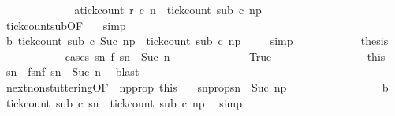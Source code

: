 \begin{isabellebody}
\ \isanewline
\ \ \ \ \ \ \ \ \ \ \isamarkupfalse%
\ a{\isacharcolon}{\isacartoucheopen}tick{\isacharunderscore}count\ r\ c\ n\ {\isacharequal}\ tick{\isacharunderscore}count\ sub\ c\ n\isactrlsub p{\isacartoucheclose}\isanewline
\ \ \ \ \ \ \ \ \ \ \ \ \isamarkupfalse%
\ tick{\isacharunderscore}count{\isacharunderscore}sub{\isacharbrackleft}OF\ {\isacharasterisk}{\isacharbrackright}\ \isamarkupfalse%
\ simp\isanewline
\ \ \ \ \ \ \ \ \ \ \isamarkupfalse%
\ b{\isacharcolon}\ {\isacartoucheopen}tick{\isacharunderscore}count\ sub\ c\ {\isacharparenleft}Suc\ n\isactrlsub p{\isacharparenright}\ {\isasymle}\ tick{\isacharunderscore}count\ sub\ c\ n\isactrlsub p{\isacartoucheclose}\ \isamarkupfalse%
\ {}\ \isamarkupfalse%
\ simp\isanewline
\ \ \ \ \ \ \ \ \ \ \isamarkupfalse%
\ {\isacharquery}thesis\isanewline
\ \ \ \ \ \ \ \ \ \ \isamarkupfalse%
\ {\isacharparenleft}cases\ {\isacartoucheopen}{\isasymexists}sn\ f\ sn\ {\isacharequal}\ Suc\ n{\isacartoucheclose}{\isacharparenright}\isanewline
\ \ \ \ \ \ \ \ \ \ \ \ \isamarkupfalse%
\ True\ %
\isanewline
\ \ \ \ \ \ \ \ \ \ \ \ \ \ \isamarkupfalse%
\ this\ \isamarkupfalse%
\ sn\ \ fsn{\isacharcolon}{\isacartoucheopen}f\ sn\ {\isacharequal}\ Suc\ n{\isacartoucheclose}\ \isamarkupfalse%
\ blast\isanewline
\ \ \ \ \ \ \ \ \ \ \ \ \ \ \isamarkupfalse%
\ next{\isacharunderscore}non{\isacharunderscore}stuttering{\isacharbrackleft}OF\ {\isacharasterisk}\ np{\isacharunderscore}prop\ this{\isacharbrackright}\ \ \isamarkupfalse%
\ sn{\isacharunderscore}prop{\isacharcolon}{\isacartoucheopen}sn\ {\isacharequal}\ Suc\ n\isactrlsub p{\isacartoucheclose}\ \isacommand{{\isachardot}}\isamarkupfalse%
\isanewline
\ \ \ \ \ \ \ \ \ \ \ \ \ \ \isamarkupfalse%
\ b\ \isamarkupfalse%
\ {\isacartoucheopen}tick{\isacharunderscore}count\ sub\ c\ sn\ {\isasymle}\ tick{\isacharunderscore}count\ sub\ c\ n\isactrlsub p{\isacartoucheclose}\ \isamarkupfalse%
\ simp\isanewline

\end{isabellebody}
